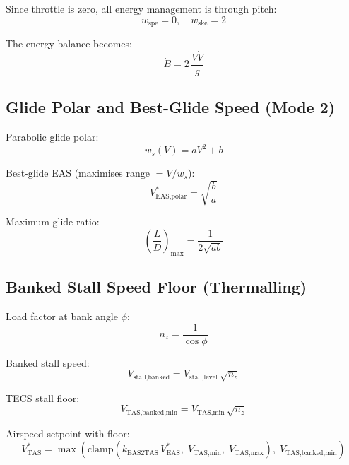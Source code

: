 \documentclass[12pt,a4paper]{report}
\begin{document}
Since throttle is zero, all energy management is through pitch:
\begin{equation}
  \boxed{w_{\text{spe}} = 0, \quad w_{\text{ske}} = 2}
\end{equation}

The energy balance becomes:
\begin{equation}
  \dot{B} = 2\,\frac{V\dot{V}}{g}
\end{equation}

\subsection{Glide Polar and Best-Glide Speed (Mode 2)}

Parabolic glide polar:
\begin{equation}
  w_s(V) = aV^2 + b
\end{equation}

Best-glide EAS (maximises range $= V/w_s$):
\begin{equation}
  \boxed{V^*_{\text{EAS,polar}} = \sqrt{\frac{b}{a}}}
\end{equation}

Maximum glide ratio:
\begin{equation}
  \left(\frac{L}{D}\right)_{\max} = \frac{1}{2\sqrt{ab}}
\end{equation}

\subsection{Banked Stall Speed Floor (Thermalling)}

Load factor at bank angle $\phi$:
\begin{equation}
  n_z = \frac{1}{\cos\phi}
\end{equation}

Banked stall speed:
\begin{equation}
  V_{\text{stall,banked}} = V_{\text{stall,level}}\,\sqrt{n_z}
\end{equation}

TECS stall floor:
\begin{equation}
  \boxed{V_{\text{TAS,banked,min}} = V_{\text{TAS,min}}\,\sqrt{n_z}}
\end{equation}

Airspeed setpoint with floor:
\begin{equation}
  V_{\text{TAS}}^* = \max\!\left(
    \text{clamp}(k_{\text{EAS2TAS}}\,V_{\text{EAS}}^*,\;
      V_{\text{TAS,min}},\;V_{\text{TAS,max}}),\;
    V_{\text{TAS,banked,min}}
  \right)
\end{equation}
\end{document}
